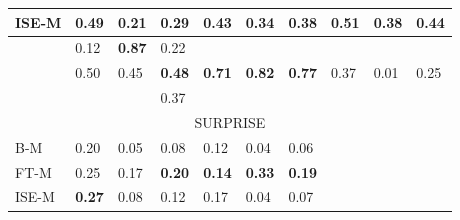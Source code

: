 \documentclass[11pt]{article}
\begin{document}
\begin{table}[ht]
\begin{tabular}{|l||l|l|l||l|l|l||l|l|l|}
\hline
    \tiny{ISE-M} & 
    \footnotesize{0.49} & 
    \footnotesize{0.21} & 
    \footnotesize{0.29} & 
    \footnotesize{0.43} & 
    \footnotesize{0.34} & 
    \footnotesize{0.38} & 
    \footnotesize{0.51} & 
    \footnotesize{0.38} & 
    \footnotesize{\textbf{0.44}} \\ 

\hline
    \tiny{\cite{strapparava2008learning} } &
    \footnotesize{0.12} & 
    \footnotesize{\textbf{0.87}} & 
    \footnotesize{0.22} &
    &
    &
    &
    &
    &
    \\

\hline
    \tiny{\cite{kim2010evaluation} } &
    \footnotesize{0.50} & 
    \footnotesize{0.45} & 
    \footnotesize{\textbf{0.48}} &
    \footnotesize{\textbf{0.71}} & 
    \footnotesize{\textbf{0.82}} & 
    \footnotesize{\textbf{0.77}} &
    \footnotesize{0.37} & 
    \footnotesize{0.01} & 
    \footnotesize{0.25} \\

\hline
    \tiny{\cite{danisman2008feeler}} &
    \footnotesize{} & 
    \footnotesize{} & 
    \footnotesize{0.37} &
    \footnotesize{} & 
    \footnotesize{} & 
    \footnotesize{} &
    \footnotesize{} & 
    \footnotesize{} & 
    \footnotesize{} \\

\hline
\hline
    \multicolumn{10}{|c|}{{SURPRISE}} \\                               
    
\hline
  \tiny{B-M} & 
  \footnotesize{0.20} & 
  \footnotesize{0.05} & 
  \footnotesize{0.08} & 
  \footnotesize{0.12} & 
  \footnotesize{0.04} & 
  \footnotesize{0.06} & 
  \footnotesize{} & 
  \footnotesize{} & 
  \footnotesize{} \\ 

\hline
    \tiny{FT-M} & 
    \footnotesize{0.25} & 
    \footnotesize{0.17} & 
    \footnotesize{\textbf{0.20}} & 
    \footnotesize{\textbf{0.14}} & 
    \footnotesize{\textbf{0.33}} & 
    \footnotesize{\textbf{0.19}} & 
    \footnotesize{} & 
    \footnotesize{} & 
    \footnotesize{} \\ 

\hline
    \tiny{ISE-M} & 
    \footnotesize{\textbf{0.27}} & 
    \footnotesize{0.08} & 
    \footnotesize{0.12} & 
    \footnotesize{0.17} & 
    \footnotesize{0.04} & 
    \footnotesize{0.07} & 
    \footnotesize{} & 
    \footnotesize{} & 
    \footnotesize{} \\ 



\end{tabular}
\end{table}
\end{document}
